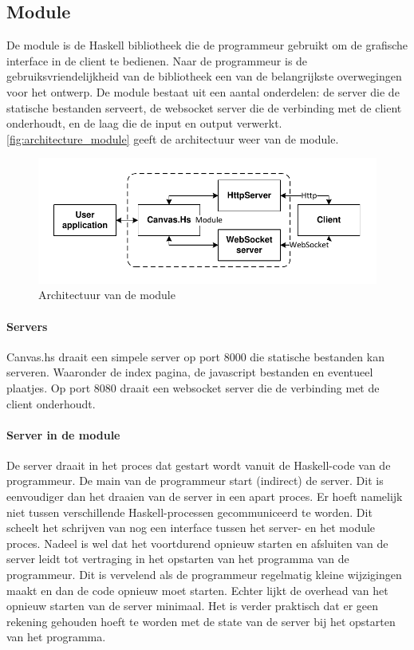 \subsection{Module} \label{subsec:module}
De module is de Haskell bibliotheek die de programmeur gebruikt om de grafische interface in de client te bedienen. Naar de programmeur is de gebruiksvriendelijkheid van de bibliotheek een van de belangrijkste overwegingen voor het ontwerp. De module bestaat uit een aantal onderdelen: de server die de statische bestanden serveert, de websocket server die de verbinding met de client onderhoudt, en de laag die de input en output verwerkt. \autoref{fig:architecture_module} geeft de architectuur weer van de module.

\begin{figure}
\begin{center}
\includegraphics[keepaspectratio,width=\textwidth]{./images/module_architecture.pdf}
\caption{Architectuur van de module}
\label{fig:architecture_module}
\end{center}
\end{figure}

\paragraph{Servers}
Canvas.hs draait een simpele server op port 8000 die statische bestanden kan serveren. Waaronder de index pagina, de javascript bestanden en eventueel plaatjes. Op port 8080 draait een websocket server die de verbinding met de client onderhoudt.


\paragraph{Server in de module}
De server draait in het proces dat gestart wordt vanuit de Haskell-code van de programmeur. De main van de programmeur start (indirect) de server. Dit is eenvoudiger dan het draaien van de server in een apart proces. Er hoeft namelijk niet tussen verschillende Haskell-processen gecommuniceerd te worden. Dit scheelt het schrijven van nog een interface tussen het server- en het module proces. Nadeel is wel dat het voortdurend opnieuw starten en afsluiten van de server leidt tot vertraging in het opstarten van het programma van de programmeur. Dit is vervelend als de programmeur regelmatig kleine wijzigingen maakt en dan de code opnieuw moet starten. Echter lijkt de overhead van het opnieuw starten van de server minimaal. Het is verder praktisch dat er geen rekening gehouden hoeft te worden met de state van de server bij het opstarten van het programma.

